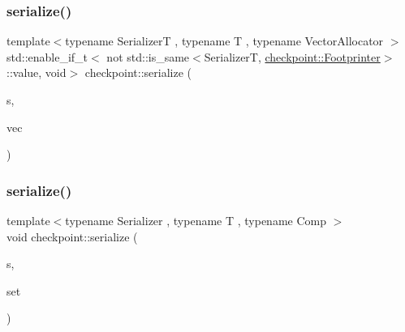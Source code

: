 \mbox{\label{namespacecheckpoint_ae9a809c203a65d06dbd99acc82be4844}} 
\subsubsection{\texorpdfstring{serialize()}{serialize()}\hspace{0.1cm}{\footnotesize\ttfamily [19/29]}}
{\footnotesize\ttfamily template$<$typename SerializerT , typename T , typename Vector\+Allocator $>$ \\
std\+::enable\+\_\+if\+\_\+t$<$ not std\+::is\+\_\+same$<$SerializerT, \hyperlink{structcheckpoint_1_1_footprinter}{checkpoint\+::\+Footprinter}$>$\+::value, void$>$ checkpoint\+::serialize (\begin{DoxyParamCaption}\item[{SerializerT \&}]{s,  }\item[{std\+::vector$<$ T, Vector\+Allocator $>$ \&}]{vec }\end{DoxyParamCaption})}

\mbox{\label{namespacecheckpoint_ae032265314cdf8e9155a6bbc423ca1c9}} 
\subsubsection{\texorpdfstring{serialize()}{serialize()}\hspace{0.1cm}{\footnotesize\ttfamily [20/29]}}
{\footnotesize\ttfamily template$<$typename Serializer , typename T , typename Comp $>$ \\
void checkpoint\+::serialize (\begin{DoxyParamCaption}\item[{\hyperlink{structcheckpoint_1_1_serializer}{Serializer} \&}]{s,  }\item[{std\+::multiset$<$ T, Comp $>$ \&}]{set }\end{DoxyParamCaption})\hspace{0.3cm}{\ttfamily [inline]}}

\mbox{\label{namespacecheckpoint_afb32627049eb840e4f8b9fd3022f2eb2}} 
